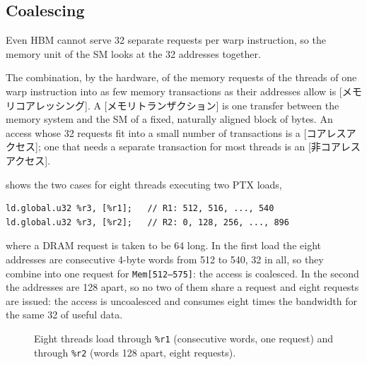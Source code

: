 \documentclass[../main.tex]{subfiles}
\begin{document}
\subsection{Coalescing}

Even HBM cannot serve 32 separate requests per warp instruction, so the
memory unit of the SM looks at the 32 addresses together.

\begin{definition}
  \label{def:l04-coalescing}
  The combination, by the hardware, of the memory requests of the
  threads of one warp instruction into as few memory transactions as
  their addresses allow is [メモリコアレッシング].
  A [メモリトランザクション] is one transfer
  between the memory system and the SM of a fixed, naturally aligned
  block of bytes.  An access whose 32 requests fit into a small number
  of transactions is a [コアレスアクセス]; one that
  needs a separate transaction for most threads is an
  [非コアレスアクセス].
\end{definition}

 shows the two cases for eight threads
executing two PTX loads,
\begin{lstlisting}[language=PTX, numbers=none]
ld.global.u32 %r3, [%r1];   // R1: 512, 516, ..., 540
ld.global.u32 %r3, [%r2];   // R2: 0, 128, 256, ..., 896
\end{lstlisting}
where a DRAM request is taken to be \SI{64}{\byte} long.  In the first
load the eight addresses are consecutive 4-byte words from 512 to 540,
\SI{32}{\byte} in all, so they combine into one request for
\texttt{Mem[512--575]}: the access is coalesced.  In the second the
addresses are \SI{128}{\byte} apart, so no two of them share a request
and eight requests are issued: the access is uncoalesced and consumes
eight times the bandwidth for the same \SI{32}{\byte} of useful
data.

\begin{figure}[htbp]
  \centering
  
  \caption{Eight threads load through \texttt{\%r1} (consecutive words,
    one request) and through \texttt{\%r2} (words \SI{128}{\byte} apart,
    eight requests).}
  \label{fig:l04-coalescing}
\end{figure}
\end{document}
